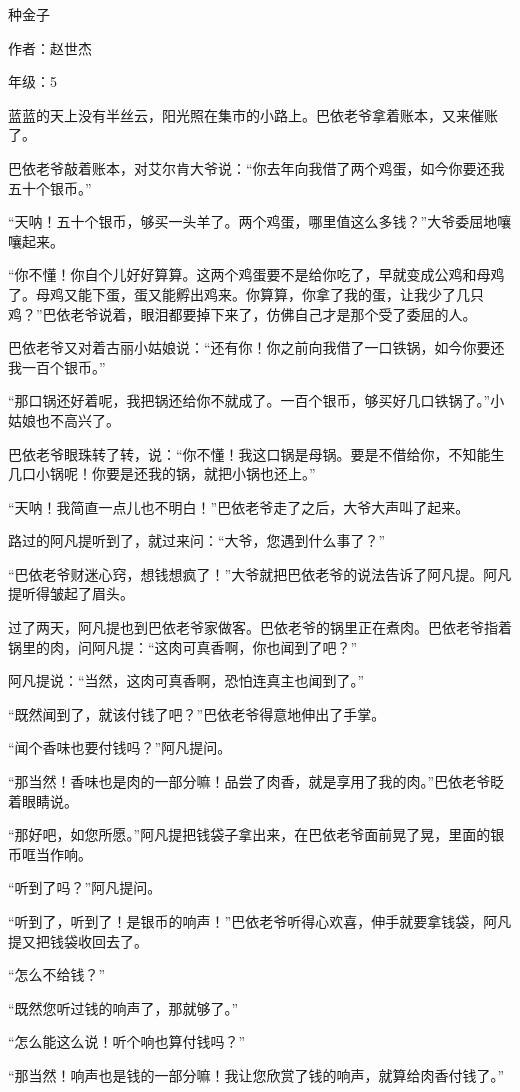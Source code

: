 种金子

作者：赵世杰

年级：5

蓝蓝的天上没有半丝云，阳光照在集市的小路上。巴依老爷拿着账本，又来催账了。

巴依老爷敲着账本，对艾尔肯大爷说：“你去年向我借了两个鸡蛋，如今你要还我五十个银币。”

“天呐！五十个银币，够买一头羊了。两个鸡蛋，哪里值这么多钱？”大爷委屈地嚷嚷起来。

“你不懂！你自个儿好好算算。这两个鸡蛋要不是给你吃了，早就变成公鸡和母鸡了。母鸡又能下蛋，蛋又能孵出鸡来。你算算，你拿了我的蛋，让我少了几只鸡？”巴依老爷说着，眼泪都要掉下来了，仿佛自己才是那个受了委屈的人。

巴依老爷又对着古丽小姑娘说：“还有你！你之前向我借了一口铁锅，如今你要还我一百个银币。”

“那口锅还好着呢，我把锅还给你不就成了。一百个银币，够买好几口铁锅了。”小姑娘也不高兴了。

巴依老爷眼珠转了转，说：“你不懂！我这口锅是母锅。要是不借给你，不知能生几口小锅呢！你要是还我的锅，就把小锅也还上。”

“天呐！我简直一点儿也不明白！”巴依老爷走了之后，大爷大声叫了起来。

路过的阿凡提听到了，就过来问：“大爷，您遇到什么事了？”

“巴依老爷财迷心窍，想钱想疯了！”大爷就把巴依老爷的说法告诉了阿凡提。阿凡提听得皱起了眉头。

过了两天，阿凡提也到巴依老爷家做客。巴依老爷的锅里正在煮肉。巴依老爷指着锅里的肉，问阿凡提：“这肉可真香啊，你也闻到了吧？”

阿凡提说：“当然，这肉可真香啊，恐怕连真主也闻到了。”

“既然闻到了，就该付钱了吧？”巴依老爷得意地伸出了手掌。

“闻个香味也要付钱吗？”阿凡提问。

“那当然！香味也是肉的一部分嘛！品尝了肉香，就是享用了我的肉。”巴依老爷眨着眼睛说。

“那好吧，如您所愿。”阿凡提把钱袋子拿出来，在巴依老爷面前晃了晃，里面的银币哐当作响。

“听到了吗？”阿凡提问。

“听到了，听到了！是银币的响声！”巴依老爷听得心欢喜，伸手就要拿钱袋，阿凡提又把钱袋收回去了。

“怎么不给钱？”

“既然您听过钱的响声了，那就够了。”

“怎么能这么说！听个响也算付钱吗？”

“那当然！响声也是钱的一部分嘛！我让您欣赏了钱的响声，就算给肉香付钱了。”


